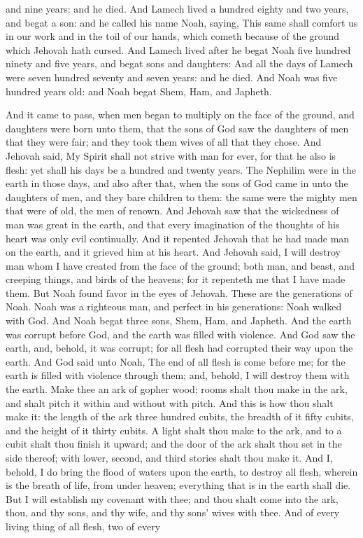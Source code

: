 and nine years: and he died.  And Lamech lived a hundred eighty and two years, and begat a son: and he called his name Noah, saying, This same shall comfort us in our work and in the toil of our hands, which cometh because of the ground which Jehovah hath cursed. And Lamech lived after he begat Noah five hundred ninety and five years, and begat sons and daughters: And all the days of Lamech were seven hundred seventy and seven years: and he died.  And Noah was five hundred years old: and Noah begat Shem, Ham, and Japheth. 

And it came to pass, when men began to multiply on the face of the ground, and daughters were born unto them, that the sons of God saw the daughters of men that they were fair; and they took them wives of all that they chose. And Jehovah said, My Spirit shall not strive with man for ever, for that he also is flesh: yet shall his days be a hundred and twenty years. The Nephilim were in the earth in those days, and also after that, when the sons of God came in unto the daughters of men, and they bare children to them: the same were the mighty men that were of old, the men of renown.  And Jehovah saw that the wickedness of man was great in the earth, and that every imagination of the thoughts of his heart was only evil continually. And it repented Jehovah that he had made man on the earth, and it grieved him at his heart. And Jehovah said, I will destroy man whom I have created from the face of the ground; both man, and beast, and creeping things, and birds of the heavens; for it repenteth me that I have made them. But Noah found favor in the eyes of Jehovah.  These are the generations of Noah. Noah was a righteous man, and perfect in his generations: Noah walked with God. And Noah begat three sons, Shem, Ham, and Japheth. And the earth was corrupt before God, and the earth was filled with violence. And God saw the earth, and, behold, it was corrupt; for all flesh had corrupted their way upon the earth.  And God said unto Noah, The end of all flesh is come before me; for the earth is filled with violence through them; and, behold, I will destroy them with the earth. Make thee an ark of gopher wood; rooms shalt thou make in the ark, and shalt pitch it within and without with pitch. And this is how thou shalt make it: the length of the ark three hundred cubits, the breadth of it fifty cubits, and the height of it thirty cubits. A light shalt thou make to the ark, and to a cubit shalt thou finish it upward; and the door of the ark shalt thou set in the side thereof; with lower, second, and third stories shalt thou make it. And I, behold, I do bring the flood of waters upon the earth, to destroy all flesh, wherein is the breath of life, from under heaven; everything that is in the earth shall die. But I will establish my covenant with thee; and thou shalt come into the ark, thou, and thy sons, and thy wife, and thy sons’ wives with thee. And of every living thing of all flesh, two of every 
